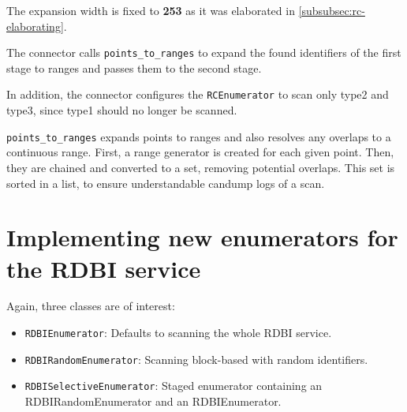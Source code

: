 The expansion width is fixed to \textbf{253} as it was elaborated in \autoref{subsubsec:rc-elaborating}.

The connector calls \texttt{points_to_ranges} to expand the found identifiers of the first stage to ranges and passes them to the second stage. 

In addition, the connector configures the \texttt{RCEnumerator} to scan only type2 and type3, since type1 should no longer be scanned.


\texttt{points_to_ranges} expands points to ranges and also resolves any overlaps to a continuous range.
First, a range generator is created for each given point. Then, they are chained and converted to a set, removing potential overlaps. 
This set is sorted in a list, to ensure understandable candump logs of a scan.

\section{Implementing new enumerators for the RDBI service}

Again, three classes are of interest:

\begin{itemize}
    \item \texttt{RDBIEnumerator}: Defaults to scanning the whole RDBI service.
    \item \texttt{RDBIRandomEnumerator}: Scanning block-based with random identifiers.
    \item \texttt{RDBISelectiveEnumerator}: Staged enumerator containing an RDBIRandomEnumerator and an RDBIEnumerator.
\end{itemize}

